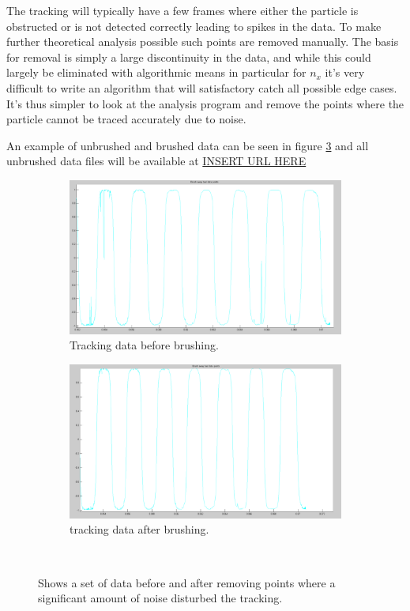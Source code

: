 The tracking will typically have a few frames where either the particle is obstructed or is not detected correctly leading to spikes in the data. To make further theoretical analysis possible such points are removed manually. The basis for removal is simply a large discontinuity in the data, and while this could largely be eliminated with algorithmic means in particular for $n_x$ it's very difficult to write an algorithm that will satisfactory catch all possible edge cases. It's thus simpler to look at the analysis program and remove the points where the particle cannot be traced accurately due to noise. 

An example of unbrushed and brushed data can be seen in figure \ref{fig:brushed} and all unbrushed data files will be available at \url{INSERT URL HERE}

\begin{figure}[H]
\centering
\begin{subfigure}[3a]{0.40\textwidth}
\includegraphics[width=\textwidth]{figures/method/Brushing3.png}
\caption{Tracking data before brushing.}\label{fig:prebrush}
\end{subfigure}\hspace{1em}%
\begin{subfigure}[3b]{0.40\textwidth}
\includegraphics[width=\textwidth]{figures/method/Brushing4.png}
\caption{tracking data after brushing.}\label{fig:postbrush}
\end{subfigure} \\
\caption{Shows a set of data before and after removing points where a significant amount of noise disturbed the tracking. } \label{fig:brushed}
\end{figure}

